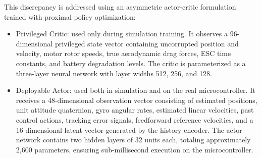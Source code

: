 \documentclass[11pt,a4paper]{article}
\begin{document}
This discrepancy is addressed using an asymmetric actor-critic formulation trained with proximal policy optimization:
\begin{itemize}[leftmargin=*,itemsep=2pt]
  \item Privileged Critic: used only during simulation training. It observes a 96-dimensional privileged state vector containing uncorrupted position and velocity, motor rotor speeds, true aerodynamic drag forces, ESC time constants, and battery degradation levels. The critic is parameterized as a three-layer neural network with layer widths 512, 256, and 128.
  \item Deployable Actor: used both in simulation and on the real microcontroller. It receives a 48-dimensional observation vector consisting of estimated positions, unit attitude quaternion, gyro angular rates, estimated linear velocities, past control actions, tracking error signals, feedforward reference velocities, and a 16-dimensional latent vector generated by the history encoder. The actor network contains two hidden layers of 32 units each, totaling approximately 2,600 parameters, ensuring sub-millisecond execution on the microcontroller.
\end{itemize}
\end{document}
